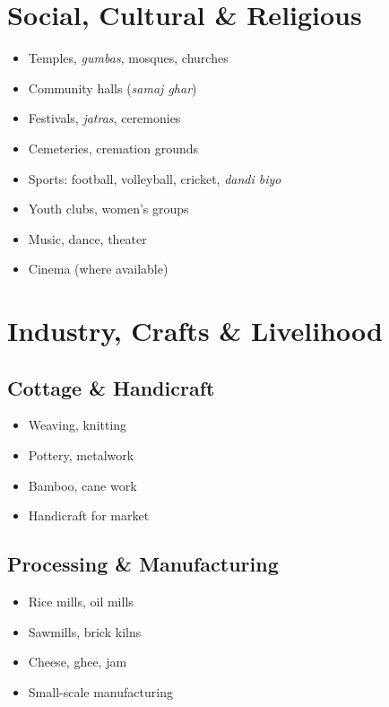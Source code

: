 \documentclass[11pt,a4paper]{article}
\begin{document}
\section{Social, Cultural \& Religious}

\begin{itemize}
    \item Temples, \textit{gumbas}, mosques, churches
    \item Community halls (\textit{samaj ghar})
    \item Festivals, \textit{jatras}, ceremonies
    \item Cemeteries, cremation grounds
    \item Sports: football, volleyball, cricket, \textit{dandi biyo}
    \item Youth clubs, women's groups
    \item Music, dance, theater
    \item Cinema (where available)
\end{itemize}

\section{Industry, Crafts \& Livelihood}

\subsection{Cottage \& Handicraft}
\begin{itemize}
    \item Weaving, knitting
    \item Pottery, metalwork
    \item Bamboo, cane work
    \item Handicraft for market
\end{itemize}

\subsection{Processing \& Manufacturing}
\begin{itemize}
    \item Rice mills, oil mills
    \item Sawmills, brick kilns
    \item Cheese, ghee, jam
    \item Small-scale manufacturing
\end{itemize}
\end{document}
